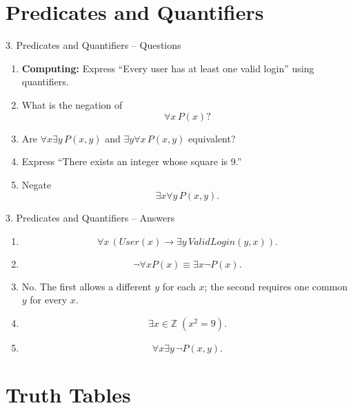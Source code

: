 \documentclass[aspectratio=169,11pt]{beamer}
\begin{document}
\section{Predicates and Quantifiers}

\begin{frame}{3. Predicates and Quantifiers -- Questions}

\begin{enumerate}
\item \textbf{Computing:} Express ``Every user has at least one valid login'' using quantifiers.

\item What is the negation of
\[
\forall x\,P(x)?
\]

\item Are $\forall x\exists y\,P(x,y)$ and
$\exists y\forall x\,P(x,y)$ equivalent?

\item Express ``There exists an integer whose square is 9.''

\item Negate
\[
\exists x\forall y\,P(x,y).
\]
\end{enumerate}

\end{frame}

\begin{frame}{3. Predicates and Quantifiers -- Answers}

\begin{enumerate}
\item
\[
\forall x\,
(User(x)\to\exists y\,ValidLogin(y,x)).
\]

\item
\[
\neg\forall xP(x)
\equiv
\exists x\neg P(x).
\]

\item No. The first allows a different $y$ for each $x$; the second requires one common $y$ for every $x$.

\item
\[
\exists x\in\mathbb Z\;(x^2=9).
\]

\item
\[
\forall x\exists y\,\neg P(x,y).
\]
\end{enumerate}

\end{frame}


\section{Truth Tables}
\end{document}
